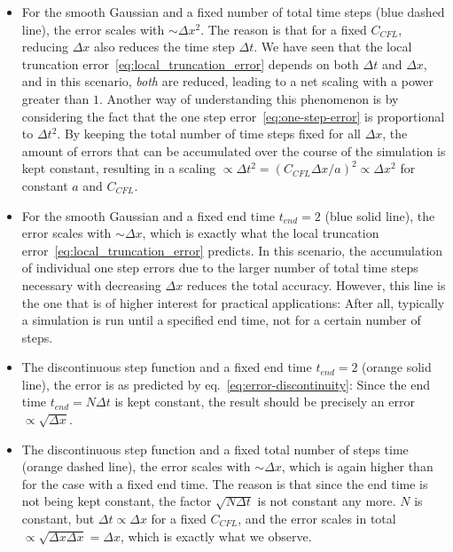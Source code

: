 \begin{itemize}
\item For the smooth Gaussian and a fixed number of total time steps (blue dashed line), the error
scales with $\sim \Delta x^2$. The reason is that for a fixed $C_{CFL}$, reducing $\Delta x$
also reduces the time step $\Delta t$. We have seen that the local truncation
error~\ref{eq:local_truncation_error} depends on both $\Delta t$ and $\Delta x$, and in this
scenario, \emph{both} are reduced, leading to a net scaling with a power greater than $1$. Another
way of understanding this phenomenon is by considering the fact that the one step
error~\ref{eq:one-step-error} is proportional to $\Delta t^2$. By keeping the total number of time
steps fixed for all $\Delta x$, the amount of errors that can be accumulated over the course of the
simulation is kept constant, resulting in a scaling $\propto \Delta t^2 = (C_{CFL} \Delta x / a)^2
\propto \Delta x^2$ for constant $a$ and $C_{CFL}$.

\item For the smooth Gaussian and a fixed end time $t_{end} = 2$ (blue solid line), the error
scales with $\sim \Delta x$, which is exactly what the local truncation
error~\ref{eq:local_truncation_error} predicts. In this scenario, the accumulation of individual
one step errors due to the larger number of total time steps necessary with decreasing $\Delta x$
reduces the total accuracy. However, this line is the one that is of higher interest for practical
applications: After all, typically a simulation is run until a specified end time, not for a
certain number of steps.

\item The discontinuous step function and a fixed end time $t_{end} = 2$ (orange solid line), the
error is as predicted by eq.~\ref{eq:error-discontinuity}: Since the end time $t_{end} = N \Delta
t$ is kept constant, the result should be precisely an error $\propto \sqrt{\Delta x}$.

\item The discontinuous step function and a fixed total number of steps time (orange dashed line),
the error scales with $\sim \Delta x$, which is again higher than for the case with a fixed end
time. The reason is that since the end time is not being kept constant, the factor $\sqrt{N \Delta
t}$ is not constant any more. $N$ is constant, but $\Delta t \propto \Delta x$ for a fixed
$C_{CFL}$, and the error scales in total $\propto \sqrt{\Delta x \Delta x} = \Delta x$, which is
exactly what we observe.
\end{itemize}


